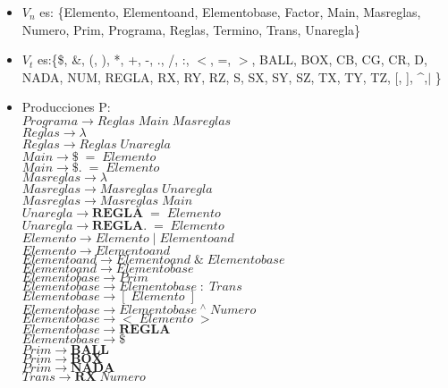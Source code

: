 \documentclass[10pt,a4paper]{article}
\begin{document}
\begin{itemize}
\item $V_n$ es: \{Elemento, Elementoand, Elementobase, Factor, Main, Masreglas, Numero, Prim, Programa, Reglas, Termino, Trans, Unaregla\}
\item $V_t$ es:\{\$, \&, (, ), *, +, -, ., /, :, $<$, =, $>$, BALL, BOX, CB, CG, CR, D, NADA, NUM, REGLA, RX, RY, RZ, S, SX, SY, SZ, TX, TY, TZ, [, ], \^{},$\vert$ \}
\item Producciones P:\\
$Programa\rightarrow{}Reglas\;Main\;Masreglas$\\
$Reglas\rightarrow{}\lambda$\\
$Reglas\rightarrow{}Reglas\;Unaregla$\\
$Main\rightarrow{}\$\;=\;Elemento$\\
$Main\rightarrow{}\$.\;=\;Elemento$\\
$Masreglas\rightarrow{}\lambda$\\
$Masreglas\rightarrow{}Masreglas\;Unaregla$\\
$Masreglas\rightarrow{}Masreglas\;Main$\\
$Unaregla\rightarrow{}\textbf{REGLA}\;=\;Elemento$\\
$Unaregla\rightarrow{}\textbf{REGLA.}\;=\;Elemento$\\
$Elemento\rightarrow{}Elemento\;|\;Elementoand$\\
$Elemento\rightarrow{}Elementoand$\\
$Elementoand\rightarrow{}Elementoand\;\&\;Elementobase$\\
$Elementoand\rightarrow{}Elementobase$\\
$Elementobase\rightarrow{}Prim$\\
$Elementobase\rightarrow{}Elementobase\;:\;Trans$\\
$Elementobase\rightarrow{}[\;Elemento\;]$\\
$Elementobase\rightarrow{}Elementobase\;{}^\wedge\;Numero$\\
$Elementobase\rightarrow{}<\;Elemento\;>$\\
$Elementobase\rightarrow{}\textbf{REGLA}$\\
$Elementobase\rightarrow{}\$$\\
$Prim\rightarrow{}\textbf{BALL}$\\
$Prim\rightarrow{}\textbf{BOX}$\\
$Prim\rightarrow{}\textbf{NADA}$\\
$Trans\rightarrow{}\textbf{RX}\;Numero$\\

\end{itemize}
\end{document}
